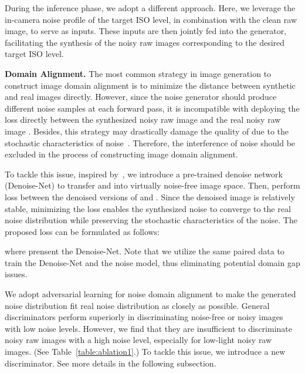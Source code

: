 \documentclass[10pt,twocolumn,letterpaper]{article}
\begin{document}
During the inference phase, we adopt a different approach. Here, we leverage the in-camera noise profile of the target ISO level, in combination with the clean raw image, to serve as inputs. These inputs are then jointly fed into the generator, facilitating the synthesis of the noisy raw images corresponding to the desired target ISO level.

\textbf{Domain Alignment.} The most common strategy in image generation to construct image domain alignment is to minimize the distance between synthetic and real images directly. However, since the noise generator should produce different noise samples at each forward pass, it is incompatible with deploying the  loss directly between the synthesized noisy raw image  and the real noisy raw image . Besides, this strategy may drastically damage the quality of  due to the stochastic characteristics of noise~\cite{cai2021learning}. Therefore, the interference of noise should be excluded in the process of constructing image domain alignment. 

To tackle this issue, inspired by~\cite{cai2021learning}, we introduce a pre-trained denoise network~\cite{chen2018learning} (Denoise-Net) to transfer  and  into virtually noise-free image space. Then, perform  loss between the denoised versions of  and . Since the denoised image is relatively stable, minimizing the  loss enables the synthesized noise to converge to the real noise distribution while preserving the stochastic characteristics of the noise. The proposed  loss can be formulated as follows:

\noindent where  prensent the Denoise-Net. Note that we utilize the same paired data to train the Denoise-Net and the noise model, thus eliminating potential domain gap issues.

We adopt adversarial learning for noise domain alignment to make the generated noise distribution fit real noise distribution as closely as possible. General discriminators perform superiorly in discriminating noise-free or noisy images with low noise levels. However, we find that they are insufficient to discriminate noisy raw images with a high noise level, especially for low-light noisy raw images. (See Table~\ref{table:ablation1}.) To tackle this issue, we introduce a new discriminator. See more details in the following subsection.
\end{document}
